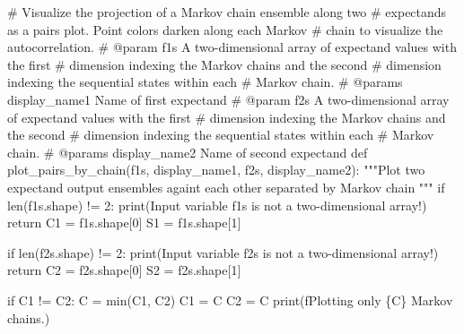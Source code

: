 \documentclass[
  letterpaper,
  DIV=11,
  numbers=noendperiod]{scrartcl}
\newenvironment{Shaded}{\begin{snugshade}}{\end{snugshade}}
\newcommand{\BuiltInTok}[1]{\textcolor[rgb]{0.00,0.23,0.31}{#1}}
\newcommand{\CommentTok}[1]{\textcolor[rgb]{0.37,0.37,0.37}{#1}}
\newcommand{\ControlFlowTok}[1]{\textcolor[rgb]{0.00,0.23,0.31}{#1}}
\newcommand{\DecValTok}[1]{\textcolor[rgb]{0.68,0.00,0.00}{#1}}
\newcommand{\KeywordTok}[1]{\textcolor[rgb]{0.00,0.23,0.31}{#1}}
\newcommand{\NormalTok}[1]{\textcolor[rgb]{0.00,0.23,0.31}{#1}}
\newcommand{\OperatorTok}[1]{\textcolor[rgb]{0.37,0.37,0.37}{#1}}
\newcommand{\SpecialCharTok}[1]{\textcolor[rgb]{0.37,0.37,0.37}{#1}}
\newcommand{\SpecialStringTok}[1]{\textcolor[rgb]{0.13,0.47,0.30}{#1}}
\newcommand{\StringTok}[1]{\textcolor[rgb]{0.13,0.47,0.30}{#1}}
\begin{document}
\begin{Shaded}
\begin{Highlighting}[]

\CommentTok{\# Visualize the projection of a Markov chain ensemble along two }
\CommentTok{\# expectands as a pairs plot.  Point colors darken along each Markov }
\CommentTok{\# chain to visualize the autocorrelation.}
\CommentTok{\# @param f1s A two{-}dimensional array of expectand values with the first }
\CommentTok{\#            dimension indexing the Markov chains and the second }
\CommentTok{\#            dimension indexing the sequential states  within each }
\CommentTok{\#            Markov chain.}
\CommentTok{\# @params display\_name1 Name of first expectand}
\CommentTok{\# @param f2s A two{-}dimensional array of expectand values with the first }
\CommentTok{\#            dimension indexing the Markov chains and the second }
\CommentTok{\#            dimension indexing the sequential states  within each }
\CommentTok{\#            Markov chain.}
\CommentTok{\# @params display\_name2 Name of second expectand}
\KeywordTok{def}\NormalTok{ plot\_pairs\_by\_chain(f1s, display\_name1,}
\NormalTok{                        f2s, display\_name2):}
  \CommentTok{"""Plot two expectand output ensembles againt each other separated by}
\CommentTok{     Markov chain """}
  \ControlFlowTok{if} \BuiltInTok{len}\NormalTok{(f1s.shape) }\OperatorTok{!=} \DecValTok{2}\NormalTok{:}
    \BuiltInTok{print}\NormalTok{(}\StringTok{\textquotesingle{}Input variable \textasciigrave{}f1s\textasciigrave{} is not a two{-}dimensional array!\textquotesingle{}}\NormalTok{)}
    \ControlFlowTok{return}
\NormalTok{  C1 }\OperatorTok{=}\NormalTok{ f1s.shape[}\DecValTok{0}\NormalTok{]}
\NormalTok{  S1 }\OperatorTok{=}\NormalTok{ f1s.shape[}\DecValTok{1}\NormalTok{]}
  
  \ControlFlowTok{if} \BuiltInTok{len}\NormalTok{(f2s.shape) }\OperatorTok{!=} \DecValTok{2}\NormalTok{:}
    \BuiltInTok{print}\NormalTok{(}\StringTok{\textquotesingle{}Input variable \textasciigrave{}f2s\textasciigrave{} is not a two{-}dimensional array!\textquotesingle{}}\NormalTok{)}
    \ControlFlowTok{return}
\NormalTok{  C2 }\OperatorTok{=}\NormalTok{ f2s.shape[}\DecValTok{0}\NormalTok{]}
\NormalTok{  S2 }\OperatorTok{=}\NormalTok{ f2s.shape[}\DecValTok{1}\NormalTok{]}
    
  \ControlFlowTok{if}\NormalTok{ C1 }\OperatorTok{!=}\NormalTok{ C2:}
\NormalTok{    C }\OperatorTok{=} \BuiltInTok{min}\NormalTok{(C1, C2)}
\NormalTok{    C1 }\OperatorTok{=}\NormalTok{ C}
\NormalTok{    C2 }\OperatorTok{=}\NormalTok{ C}
    \BuiltInTok{print}\NormalTok{(}\SpecialStringTok{f\textquotesingle{}Plotting only }\SpecialCharTok{\{}\NormalTok{C}\SpecialCharTok{\}}\SpecialStringTok{ Markov chains.\textquotesingle{}}\NormalTok{)}
  

\end{Highlighting}
\end{Shaded}
\end{document}
